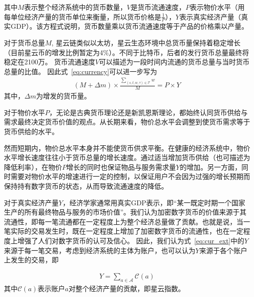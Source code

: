 \noindent 其中$M$表示整个经济系统中的货币数量，$V$是货币流通速度，$P$表示物价水平（用每单位经济产量的货币单位来衡量，所以货币价格是$\frac{1}{P}$），$Y$表示真实经济产量（真实GDP）。该方程式说明，货币数量乘以货币流通速度等于产品的价格乘以产量。


对于货币总量$M$, 星云链类似以太坊，星云生态环境中总货币量保持着稳定增长（目前星云币的增发比例暂定为4\%）。不同于比特币，后者的发行货币总量最终将稳定在2100万。
货币流通速度$V$可以描述为一段时间内流通的货币总量与当时货币总量的比值。
因此式~\ref{eq:currency}可以进一步写为
\begin{align}
(M + \Delta{m}) \times \frac{\sum_{(s, t, w, \tau)\in \mathcal{T}}{w}}{M} = P \times Y
\label{eq:cur_ext}
\end{align}
\noindent 其中，$\Delta{m}$为增发的货币量。



对于物价水平$P$，无论是古典货币理论还是新凯恩斯理论，都始终认同货币供给与需求最终决定货币价值的观点。从长期来看，物价总水平会调整到使货币需求等于货币供给的水平。

然而短期内，物价总水平本身并不能使货币供求平衡。在健康的经济系统中，物价水平增长速度往往小于货币总量的增长速度。通过适当增加货币供给（也可描述为降低利率），在物价$P$增长的同时也保证物品与服务需求量$Y$的增加。另一方面，同时需要对物价水平的增速进行一定的控制，以保证用户不会因为过强的增长预期而保持持有数字货币的状态，从而导致流通速度的降低。




对于真实经济产量$Y$，经济学家通常用真实GDP表示，即“某一既定时期一个国家生产的所有最终物品与服务的市场价值”。我们认为加密数字货币的价值来源于其流通性，即每一笔流通都在一定程度上为整个经济总量做了贡献。也就是说，当一笔实际的交易发生时，既在一定程度上增加了加密数字货币的流通性，也在一定程度上增强了人们对数字货币的认可及信心。
因此，我们认为式~\ref{eq:cur_ext}中的$Y$来源于每一笔交易，考虑到经济系统的主体为账户，也可以认为$Y$来源于各个账户上发生的交易，即

\begin{align}
Y=\sum_{a\in \mathcal{A}} \mathcal{C}(a)
\end{align}
\noindent 其中$\mathcal{C}(a)$表示账户$a$对整个经济产量的贡献，即星云指数。

